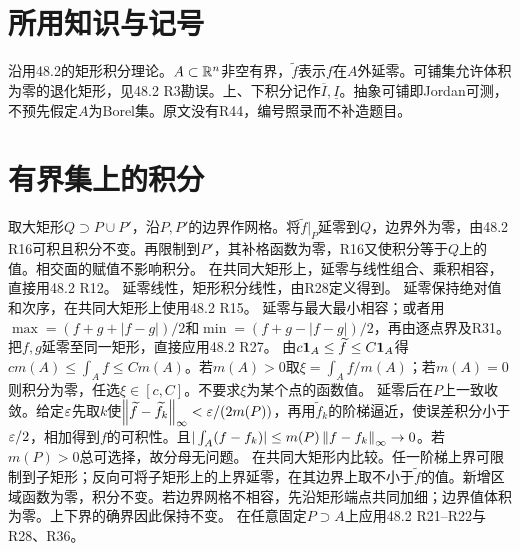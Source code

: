 \documentclass[UTF8,fontset=fandol,11pt]{ctexart}
\begin{document}
\section*{所用知识与记号}
沿用48.2的矩形积分理论。$A\subset\mathbb R^n$非空有界，$\widetilde f$表示$f$在$A$外延零。可铺集允许体积为零的退化矩形，见48.2 R3勘误。上、下积分记作$\overline I,\underline I$。抽象可铺即Jordan可测，不预先假定$A$为Borel集。原文没有R44，编号照录而不补造题目。
\section{有界集上的积分}
取大矩形$Q\supset P\cup P'$，沿$P,P'$的边界作网格。将$\widetilde f|_P$延零到$Q$，边界外为零，由48.2 R16可积且积分不变。再限制到$P'$，其补格函数为零，R16又使积分等于$Q$上的值。相交面的赋值不影响积分。
在共同大矩形上，延零与线性组合、乘积相容，直接用48.2 R12。
延零线性，矩形积分线性，由R28定义得到。
延零保持绝对值和次序，在共同大矩形上使用48.2 R15。
延零与最大最小相容；或者用$\max=(f+g+|f-g|)/2$和$\min=(f+g-|f-g|)/2$，再由逐点界及R31。
把$f,g$延零至同一矩形，直接应用48.2 R27。
由$c\mathbf1_A\le\widetilde f\le C\mathbf1_A$得$cm(A)\le\int_Af\le Cm(A)$。若$m(A)>0$取$\xi=\int_Af/m(A)$；若$m(A)=0$则积分为零，任选$\xi\in[c,C]$。不要求$\xi$为某个点的函数值。
延零后在$P$上一致收敛。给定$\varepsilon$先取$k$使$\left\lVert\widetilde f-\widetilde f_k\right\rVert_\infty<\varepsilon/(2m(P))$，再用$\widetilde f_k$的阶梯逼近，使误差积分小于$\varepsilon/2$，相加得到$f$的可积性。且$|\int_A(f-f_k)|\le m(P)\left\lVert f-f_k\right\rVert_\infty\to0$。若$m(P)>0$总可选择，故分母无问题。
在共同大矩形内比较。任一阶梯上界可限制到子矩形；反向可将子矩形上的上界延零，在其边界上取不小于$\widetilde f$的值。新增区域函数为零，积分不变。若边界网格不相容，先沿矩形端点共同加细；边界值体积为零。上下界的确界因此保持不变。
在任意固定$P\supset A$上应用48.2 R21--R22与R28、R36。
\end{document}
